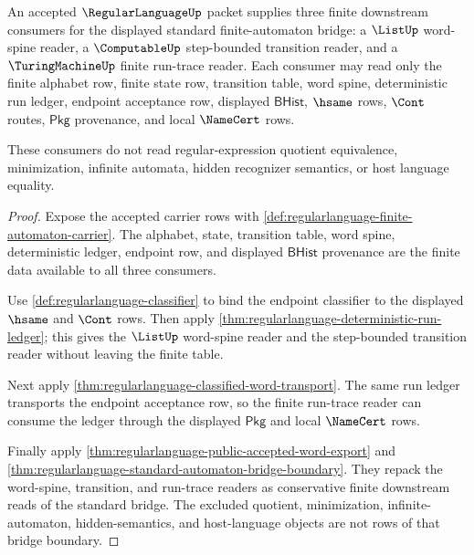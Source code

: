 \begin{theorem}
\label{thm:regularlanguage-displayed-automaton-consumer-examples}
An accepted $\RegularLanguageUp$ packet supplies three finite downstream
consumers for the displayed standard finite-automaton bridge: a $\ListUp$
word-spine reader, a $\ComputableUp$ step-bounded transition reader, and a
$\TuringMachineUp$ finite run-trace reader. Each consumer may read only the
finite alphabet row, finite state row, transition table, word spine,
deterministic run ledger, endpoint acceptance row, displayed $\mathsf{BHist}$,
$\hsame$ rows, $\Cont$ routes, $\mathsf{Pkg}$ provenance, and local
$\NameCert$ rows.

These consumers do not read regular-expression quotient equivalence,
minimization, infinite automata, hidden recognizer semantics, or host language
equality.
\end{theorem}
\begin{proof}
Expose the accepted carrier rows with
\autoref{def:regularlanguage-finite-automaton-carrier}. The alphabet, state,
transition table, word spine, deterministic ledger, endpoint row, and displayed
$\mathsf{BHist}$ provenance are the finite data available to all three
consumers.

Use \autoref{def:regularlanguage-classifier} to bind the endpoint classifier to
the displayed $\hsame$ and $\Cont$ rows. Then apply
\autoref{thm:regularlanguage-deterministic-run-ledger}; this gives the
$\ListUp$ word-spine reader and the step-bounded transition reader without
leaving the finite table.

Next apply \autoref{thm:regularlanguage-classified-word-transport}. The same
run ledger transports the endpoint acceptance row, so the finite run-trace
reader can consume the ledger through the displayed $\mathsf{Pkg}$ and local
$\NameCert$ rows.

Finally apply \autoref{thm:regularlanguage-public-accepted-word-export} and
\autoref{thm:regularlanguage-standard-automaton-bridge-boundary}. They repack
the word-spine, transition, and run-trace readers as conservative finite
downstream reads of the standard bridge. The excluded quotient, minimization,
infinite-automaton, hidden-semantics, and host-language objects are not rows of
that bridge boundary.
\end{proof}


